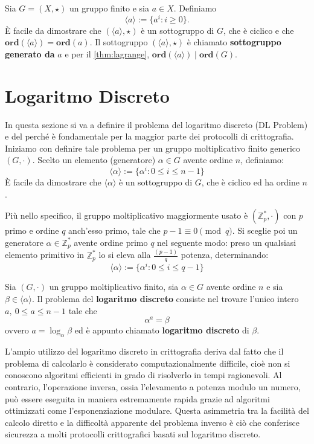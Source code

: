 \begin{de}
    Sia $G = (X, \star)$ un gruppo finito e sia $a \in X$. Definiamo
    \[
    \langle a \rangle := \{a^i: i \geq 0\}.
    \]
    È facile da dimostrare che $(\langle a \rangle, \star)$ è un sottogruppo di $G$, che è ciclico e che $\mathbf{ord}(\langle a \rangle) = \mathbf{ord}(a)$. Il sottogruppo $(\langle a \rangle, \star)$ è chiamato \textbf{sottogruppo generato da} $a$ e per il \autoref{thm:lagrange}, $\mathbf{ord}(\langle a \rangle) \mid \mathbf{ord}(G)$. 
\end{de}

\section{Logaritmo Discreto}\label{sec:dl}

In questa sezione si va a definire il problema del logaritmo discreto (DL Problem) e del perché è fondamentale per la maggior parte dei protocolli di crittografia.
Iniziamo con definire tale problema per un gruppo moltiplicativo finito generico $(G, \cdot)$. Scelto un elemento (generatore) $\alpha \in G$ avente ordine $n$, definiamo:
$$\langle\alpha\rangle := \{ \alpha^i: 0 \leq i \leq n - 1 \}$$
È facile da dimostrare che $\langle\alpha\rangle$ è un sottogruppo di $G$, che è ciclico ed ha ordine $n$.

Più nello specifico, il gruppo moltiplicativo maggiormente usato è $(\mathbb{Z}_p^\ast, \cdot)$ con $p$ primo e ordine $q$ anch'esso primo, tale che $p - 1 \equiv 0 \pmod{q}$. Si sceglie poi un generatore $\alpha \in \mathbb{Z}_p^\ast$ avente ordine primo $q$ nel seguente modo: preso un qualsiasi elemento primitivo in $\mathbb{Z}_p^\ast$ lo si eleva alla $\frac{(p - 1)}{q}$ potenza, determinando:
$$\langle\alpha\rangle := \{ \alpha^i: 0 \leq i \leq q - 1 \}$$

\begin{de}
	Sia $(G, \cdot)$ un gruppo moltiplicativo finito, sia $\alpha \in G$ avente ordine $n$ e sia $\beta \in \langle\alpha\rangle$. Il problema del \textbf{logaritmo discreto} consiste nel trovare l'unico intero $a,\ 0 \leq a \leq n - 1$ tale che 
	$$\alpha^a = \beta$$
	ovvero $a = \log_\alpha{\beta}$ ed è appunto chiamato \textbf{logaritmo discreto} di $\beta$.
\end{de}

L'ampio utilizzo del logaritmo discreto in crittografia deriva dal fatto che il problema di calcolarlo è considerato computazionalmente difficile, cioè non si conoscono algoritmi efficienti in grado di risolverlo in tempi ragionevoli. Al contrario, l'operazione inversa, ossia l'elevamento a potenza modulo un numero, può essere eseguita in maniera estremamente rapida grazie ad algoritmi ottimizzati come l'esponenziazione modulare. Questa asimmetria tra la facilità del calcolo diretto e la difficoltà apparente del problema inverso è ciò che conferisce sicurezza a molti protocolli crittografici basati sul logaritmo discreto.

